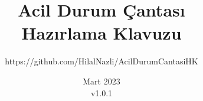 \documentclass[openany]{book}
\begin{document}
\author{https://github.com/HilalNazli/AcilDurumCantasiHK}
\title{Acil Durum Çantası\\Hazırlama Klavuzu}
\date{Mart 2023\\v1.0.1}

\maketitle












\backmatter
\end{document}
